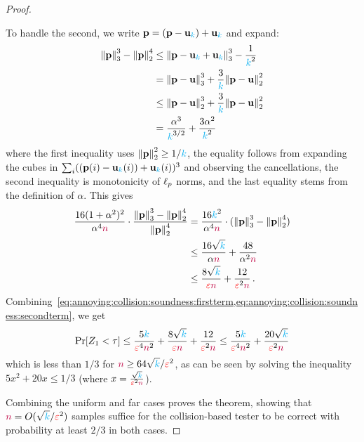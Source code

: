 \begin{proof}
\begin{itemize}
    To handle the second, we write $\p=(\p-\uniform_\ab)+\uniform_\ab$ and expand:%
    \begin{align}
        \norm{\p}_3^3-\normtwo{\p}^4
        &\leq \norm{\p-\uniform_\ab+\uniform_\ab}_3^3-\frac{1}{\ab^2} \notag\\
        &= \norm{\p-\uniform}_3^3 + \frac{3}{\ab}\normtwo{\p-\uniform}^2 \label{eq:collision:before:monotonicity}\\
        &\leq \normtwo{\p-\uniform}^3 + \frac{3}{\ab}\normtwo{\p-\uniform}^2\notag\\
        &= \frac{\alpha^{3}}{\ab^{3/2}} + \frac{3\alpha^2}{\ab^2}
    \end{align}
    where the first inequality uses $\normtwo{\p}^2 \geq 1/\ab$, the equality follows from expanding the cubes in $\sum_i ((\p(i)-\uniform_\ab(i))+\uniform_\ab(i))^3$ and observing the cancellations, the second inequality is monotonicity of $\lp[p]$ norms, and the last equality stems from the definition of $\alpha$. This gives
    \begin{align}
        \frac{16(1+\alpha^2)^2}{\alpha^4\ns}\cdot \frac{\norm{\p}_3^3-\normtwo{\p}^4}{\normtwo{\p}^4}
        &= \frac{16\ab^2}{\alpha^4\ns}\cdot (\norm{\p}_3^3-\normtwo{\p}^4) \notag\\
        &\leq \frac{16\sqrt{\ab}}{\alpha\ns}+ \frac{48}{\alpha^2\ns} \notag\\
        &\leq \frac{8\sqrt{\ab}}{\dst\ns}+ \frac{12}{\dst^2\ns}\,. \label{eq:annoying:collision:soundness:secondterm}
    \end{align}
    Combining~\cref{eq:annoying:collision:soundness:firstterm,eq:annoying:collision:soundness:secondterm}, we get
    \[
        \bPr{Z_1 < \tau} \leq \frac{5\ab}{\dst^4\ns^2} + \frac{8\sqrt{\ab}}{\dst\ns}+ \frac{12}{\dst^2\ns}
        \leq \frac{5\ab}{\dst^4\ns^2} + \frac{20\sqrt{\ab}}{\dst^2\ns}
    \]
    which is less than $1/3$ for $\ns \geq 64\sqrt{\ab}/\dst^2$, as can be seen by solving the inequality $5x^2 + 20x\leq 1/3$ (where $x=\frac{\sqrt{\ab}}{\dst^2\ns}$).
  \end{itemize}
  Combining the uniform and far cases proves the theorem, showing that $\ns = O(\sqrt{\ab}/\dst^2)$ samples suffice for the collision-based tester to be correct with probability at least $2/3$ in both cases.
\end{proof}


